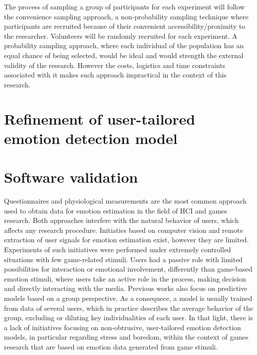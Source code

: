 The process of sampling a group of participants for each experiment will follow the convenience sampling approach, a non-probability sampling technique where participants are recruited because of their convenient accessibility/proximity to the researcher. Volunteers will be randomly recruited for each experiment. A probability sampling approach, where each individual of the population has an equal chance of being selected, would be ideal and would strength the external validity of the research. However the costs, logistics and time constraints associated with it makes such approach impractical in the context of this research.

\section{Refinement of user-tailored emotion detection model}

\section{Software validation}

Questionnaires and physiological measurements are the most common approach used to obtain data for emotion estimation in the field of HCI and games research. Both approaches interfere with the natural behavior of users, which affects any research procedure. Initiaties based on computer vision and remote extraction of user signals for emotion estimation exist, however they are limited. Experiments of such initiatives were performed under extremely controlled situations with few game-related stimuli. Users had a passive role with limited possibilities for interaction or emotional involvement, differently than game-based emotion stimuli, where users take an active role in the process, making decision and directly interacting with the media. Previous works also focus on predictive models based on a group perspective. As a consequece, a model is usually trained from data of several users, which in practice describes the average behavior of the group, excluding or diluting key individualities of each user. In that light, there is a lack of initiatives focusing on non-obtrusive, user-tailored emotion detection models, in particular regarding stress and boredom, within the context of games research that are based on emotion data generated from game stimuli.

